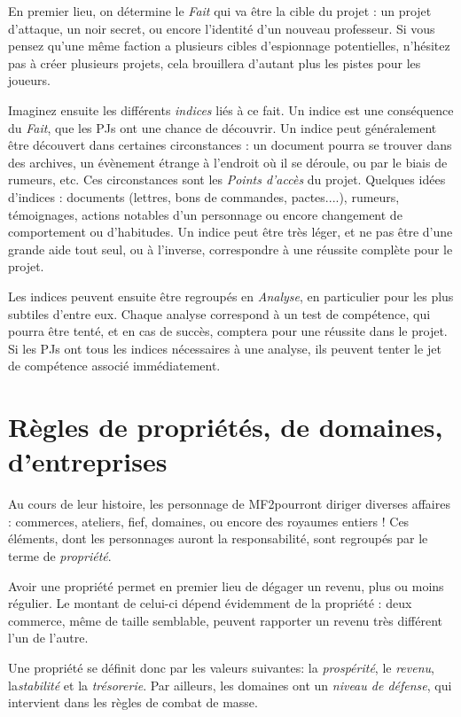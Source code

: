 \documentclass[10pt,a4paper]{book}
\newcommand{\titre}{MF2}
\begin{document}
\begin{multicols}{2}
En premier lieu, on détermine le \emph{Fait} qui va être la cible du projet : un projet d'attaque, un noir secret, ou encore l'identité d'un nouveau professeur. Si vous pensez qu'une même faction a plusieurs cibles d'espionnage potentielles, n'hésitez pas à créer plusieurs projets, cela brouillera d'autant plus les pistes pour les joueurs.

Imaginez ensuite les différents \emph{indices} liés à ce fait. Un indice est une conséquence du \emph{Fait}, que les PJs ont une chance de découvrir. Un indice peut généralement être découvert dans certaines circonstances : un document pourra se trouver dans des archives, un évènement étrange à l'endroit où il se déroule, ou par le biais de rumeurs, etc. Ces circonstances sont les \emph{Points d'accès} du projet. Quelques idées d'indices : documents (lettres, bons de commandes, pactes....), rumeurs, témoignages, actions notables d'un personnage ou encore changement de comportement ou d'habitudes. Un indice peut être très léger, et ne pas être d'une grande aide tout seul, ou à l'inverse, correspondre à une réussite complète pour le projet.

Les indices peuvent ensuite être regroupés en \emph{Analyse}, en particulier pour les plus subtiles d'entre eux. Chaque analyse correspond à un test de compétence, qui pourra être tenté, et en cas de succès, comptera pour une réussite dans le projet. Si les PJs ont tous les indices nécessaires à une analyse, ils peuvent tenter le jet de compétence associé immédiatement.


\section{Règles de propriétés, de domaines, d'entreprises}
Au cours de leur histoire, les personnage de \titre pourront diriger diverses affaires : commerces, ateliers, fief, domaines, ou encore des royaumes entiers ! Ces éléments, dont les personnages auront la responsabilité, sont regroupés par le terme de \emph{propriété}. 

Avoir une propriété permet en premier lieu de dégager un revenu, plus ou moins régulier. Le montant de celui-ci dépend évidemment de la propriété : deux commerce, même de taille semblable, peuvent rapporter un revenu très différent l'un de l'autre.

Une propriété se définit donc par les valeurs suivantes: la \emph{prospérité}, le \emph{revenu}, la\emph{stabilité} et la \emph{trésorerie}. Par ailleurs, les domaines ont un \emph{niveau de défense}, qui intervient dans les règles de combat de masse.


\end{multicols}
\end{document}
